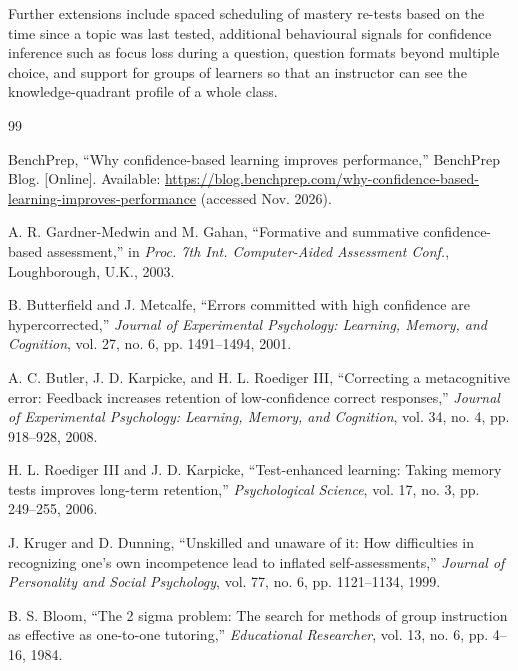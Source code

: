 \documentclass[12pt,a4paper,oneside]{report}
\begin{document}
Further extensions include spaced scheduling of mastery re-tests based on
the time since a topic was last tested, additional behavioural signals
for confidence inference such as focus loss during a question, question formats beyond multiple
choice, and support for groups of learners so that an instructor can see
the knowledge-quadrant profile of a whole class.

\begin{thebibliography}{99}

BenchPrep, ``Why confidence-based learning improves performance,''
BenchPrep Blog. [Online]. Available:
\url{https://blog.benchprep.com/why-confidence-based-learning-improves-performance}
(accessed Nov. 2026).

A. R. Gardner-Medwin and M. Gahan, ``Formative and summative
confidence-based assessment,'' in \emph{Proc. 7th Int. Computer-Aided
Assessment Conf.}, Loughborough, U.K., 2003.

B. Butterfield and J. Metcalfe, ``Errors committed with high confidence are
hypercorrected,'' \emph{Journal of Experimental Psychology: Learning,
Memory, and Cognition}, vol. 27, no. 6, pp. 1491--1494, 2001.

A. C. Butler, J. D. Karpicke, and H. L. Roediger III, ``Correcting a
metacognitive error: Feedback increases retention of low-confidence
correct responses,'' \emph{Journal of Experimental Psychology: Learning,
Memory, and Cognition}, vol. 34, no. 4, pp. 918--928, 2008.

H. L. Roediger III and J. D. Karpicke, ``Test-enhanced learning: Taking
memory tests improves long-term retention,'' \emph{Psychological Science},
vol. 17, no. 3, pp. 249--255, 2006.

J. Kruger and D. Dunning, ``Unskilled and unaware of it: How difficulties in
recognizing one's own incompetence lead to inflated self-assessments,''
\emph{Journal of Personality and Social Psychology}, vol. 77, no. 6,
pp. 1121--1134, 1999.

B. S. Bloom, ``The 2 sigma problem: The search for methods of group
instruction as effective as one-to-one tutoring,'' \emph{Educational
Researcher}, vol. 13, no. 6, pp. 4--16, 1984.


\end{thebibliography}
\end{document}
